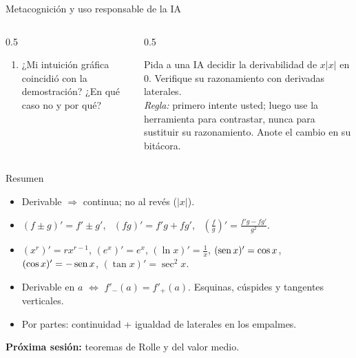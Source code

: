 \documentclass[10pt,aspectratio=169]{beamer}
\begin{document}
\begin{frame}{Metacognición y uso responsable de la IA}
  \small
  \begin{columns}[t]
    \begin{column}{0.5\textwidth}
      \begin{metacog}
        \begin{enumerate}
          \metacomun
          \item ¿Mi intuición gráfica coincidió con la demostración? ¿En qué caso no y por qué?
        \end{enumerate}
      \end{metacog}
    \end{column}
    \begin{column}{0.5\textwidth}
      \begin{iabox}
        Pida a una IA decidir la derivabilidad de $x|x|$ en $0$. Verifique su razonamiento con derivadas laterales.\\[2pt]
        \textit{Regla:} primero intente usted; luego use la herramienta para contrastar, nunca para sustituir su razonamiento. Anote el cambio en su bitácora.
      \end{iabox}
    \end{column}
  \end{columns}
\end{frame}

\begin{frame}{Resumen}
  \begin{itemize}
    \item Derivable $\Rightarrow$ continua; no al revés ($|x|$).
    \item $(f\pm g)'=f'\pm g'$, \ $(fg)'=f'g+fg'$, \ $\left(\frac fg\right)'=\frac{f'g-fg'}{g^2}$.
    \item $(x^r)'=rx^{r-1}$, $(e^x)'=e^x$, $(\ln x)'=\frac1x$, $(\operatorname{sen} x)'=\cos x$, $(\cos x)'=-\operatorname{sen} x$, $(\tan x)'=\sec^2x$.
    \item Derivable en $a$ $\iff$ $f'_-(a)=f'_+(a)$. Esquinas, cúspides y tangentes verticales.
    \item Por partes: continuidad + igualdad de laterales en los empalmes.
  \end{itemize}
  \vspace{3mm}
  \textbf{Próxima sesión:} teoremas de Rolle y del valor medio.
\end{frame}
\end{document}
